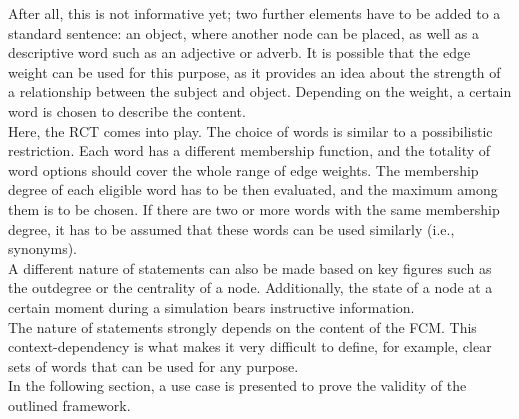 \documentclass[conference]{IEEEtran}
\begin{document}
After all, this is not informative yet; two further elements have to be added to a standard sentence: an object, where another node can be placed, as well as a descriptive word such as an adjective or adverb. It is possible that the edge weight can be used for this purpose, as it provides an idea about the strength of a relationship between the subject and object. Depending on the weight, a certain word is chosen to describe the content.\\
Here, the RCT comes into play. The choice of words is similar to a possibilistic restriction. Each word has a different membership function, and the totality of word options should cover the whole range of edge weights. The membership degree of each eligible word has to be then evaluated, and the maximum among them is to be chosen. If there are two or more words with the same membership degree, it has to be assumed that these words can be used similarly (i.e., synonyms).\\
A different nature of statements can also be made based on key figures such as the outdegree or the centrality of a node. Additionally, the state of a node at a certain moment during a simulation bears instructive information.\\
The nature of statements strongly depends on the content of the FCM. This context-dependency is what makes it very difficult to define, for example, clear sets of words that can be used for any purpose.\\
In the following section, a use case is presented to prove the validity of the outlined framework.
\end{document}

